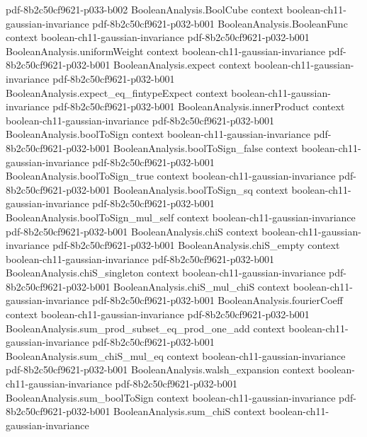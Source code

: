 \begin{lemma}
  {pdf-8b2c50cf9621-p033-b002}
\proofstep
  {BooleanAnalysis.BoolCube}
  {context}
  {boolean-ch11-gaussian-invariance}
  {pdf-8b2c50cf9621-p032-b001}
\proofstep
  {BooleanAnalysis.BooleanFunc}
  {context}
  {boolean-ch11-gaussian-invariance}
  {pdf-8b2c50cf9621-p032-b001}
\proofstep
  {BooleanAnalysis.uniformWeight}
  {context}
  {boolean-ch11-gaussian-invariance}
  {pdf-8b2c50cf9621-p032-b001}
\proofstep
  {BooleanAnalysis.expect}
  {context}
  {boolean-ch11-gaussian-invariance}
  {pdf-8b2c50cf9621-p032-b001}
\proofstep
  {BooleanAnalysis.expect_eq_fintypeExpect}
  {context}
  {boolean-ch11-gaussian-invariance}
  {pdf-8b2c50cf9621-p032-b001}
\proofstep
  {BooleanAnalysis.innerProduct}
  {context}
  {boolean-ch11-gaussian-invariance}
  {pdf-8b2c50cf9621-p032-b001}
\proofstep
  {BooleanAnalysis.boolToSign}
  {context}
  {boolean-ch11-gaussian-invariance}
  {pdf-8b2c50cf9621-p032-b001}
\proofstep
  {BooleanAnalysis.boolToSign_false}
  {context}
  {boolean-ch11-gaussian-invariance}
  {pdf-8b2c50cf9621-p032-b001}
\proofstep
  {BooleanAnalysis.boolToSign_true}
  {context}
  {boolean-ch11-gaussian-invariance}
  {pdf-8b2c50cf9621-p032-b001}
\proofstep
  {BooleanAnalysis.boolToSign_sq}
  {context}
  {boolean-ch11-gaussian-invariance}
  {pdf-8b2c50cf9621-p032-b001}
\proofstep
  {BooleanAnalysis.boolToSign_mul_self}
  {context}
  {boolean-ch11-gaussian-invariance}
  {pdf-8b2c50cf9621-p032-b001}
\proofstep
  {BooleanAnalysis.chiS}
  {context}
  {boolean-ch11-gaussian-invariance}
  {pdf-8b2c50cf9621-p032-b001}
\proofstep
  {BooleanAnalysis.chiS_empty}
  {context}
  {boolean-ch11-gaussian-invariance}
  {pdf-8b2c50cf9621-p032-b001}
\proofstep
  {BooleanAnalysis.chiS_singleton}
  {context}
  {boolean-ch11-gaussian-invariance}
  {pdf-8b2c50cf9621-p032-b001}
\proofstep
  {BooleanAnalysis.chiS_mul_chiS}
  {context}
  {boolean-ch11-gaussian-invariance}
  {pdf-8b2c50cf9621-p032-b001}
\proofstep
  {BooleanAnalysis.fourierCoeff}
  {context}
  {boolean-ch11-gaussian-invariance}
  {pdf-8b2c50cf9621-p032-b001}
\proofstep
  {BooleanAnalysis.sum_prod_subset_eq_prod_one_add}
  {context}
  {boolean-ch11-gaussian-invariance}
  {pdf-8b2c50cf9621-p032-b001}
\proofstep
  {BooleanAnalysis.sum_chiS_mul_eq}
  {context}
  {boolean-ch11-gaussian-invariance}
  {pdf-8b2c50cf9621-p032-b001}
\proofstep
  {BooleanAnalysis.walsh_expansion}
  {context}
  {boolean-ch11-gaussian-invariance}
  {pdf-8b2c50cf9621-p032-b001}
\proofstep
  {BooleanAnalysis.sum_boolToSign}
  {context}
  {boolean-ch11-gaussian-invariance}
  {pdf-8b2c50cf9621-p032-b001}
\proofstep
  {BooleanAnalysis.sum_chiS}
  {context}
  {boolean-ch11-gaussian-invariance}

\end{lemma}
